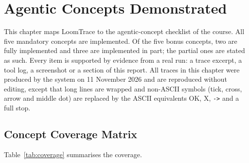 \chapter{Agentic Concepts Demonstrated}

This chapter maps LoomTrace to the agentic-concept checklist of the course. All five mandatory
concepts are implemented. Of the five bonus concepts, two are fully implemented and three are
implemented in part; the partial ones are stated as such. Every item is supported by evidence from a
real run: a trace excerpt, a tool log, a screenshot or a section of this report. All traces in this
chapter were produced by the system on 11 November 2026 and are reproduced without editing, except
that long lines are wrapped and non-ASCII symbols (tick, cross, arrow and middle dot) are replaced by
the ASCII equivalents OK, X, \texttt{->} and a full stop.

\section{Concept Coverage Matrix}

Table~\ref{tab:coverage} summarises the coverage.

